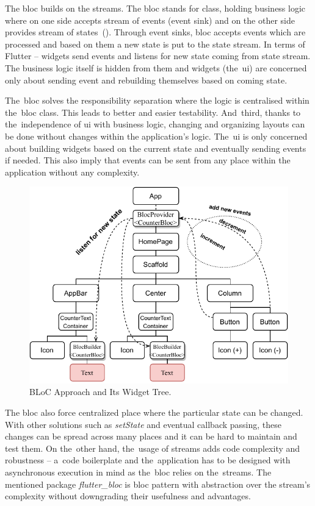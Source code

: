 The \gls{bloc} builds on the streams. The \gls{bloc} stands for class, holding business logic where on one side accepts stream of events (event sink) and on the other side provides stream of states~(). Through event sinks, \gls{bloc} accepts events which are processed and based on them a new state is put to the state stream. In terms of Flutter -- widgets send events and listens for new state coming from state stream. The business logic itself is hidden from them and widgets (the~\gls{ui}) are concerned only about sending event and rebuilding themselves based on coming state.

The~\gls{bloc} solves the responsibility separation where the logic is centralised within the~\gls{bloc} class. This leads to better and easier testability. And~third, thanks to the~independence of \gls{ui} with business logic, changing and organizing layouts can be done without changes within the application's logic. The~\gls{ui} is only concerned about building widgets based on the current state and eventually sending events if needed. This also imply that events can be sent from any place within the application without any complexity.

\begin{figure}[ht]
    \centering
    \includegraphics[width=0.75\linewidth]{img/flutter/counter-bloc.pdf}
    \caption{BLoC Approach and Its Widget Tree.}
    \label{fig:counter-app-bloc}
\end{figure}

The \gls{bloc} also force centralized place where the particular state can be changed. With other solutions such as \textit{setState} and eventual callback passing, these changes can be spread across many places and it can be hard to maintain and test them. On the~other hand, the~usage of streams adds code complexity and robustness -- a~code boilerplate and the~application has to be designed with asynchronous execution in mind as the~\gls{bloc} relies on the~streams. The mentioned package \textit{flutter\_bloc} is \gls{bloc} pattern with abstraction over the stream's complexity without downgrading their usefulness and advantages. 

